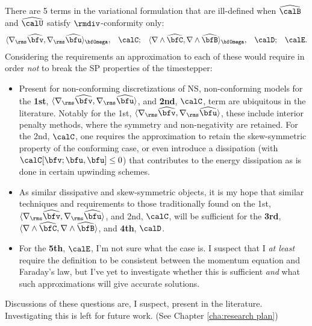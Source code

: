 \begin{remark}
        There are 5 terms in the variational formulation that are ill-defined when $\widehat{\calB}$ and $\widehat{\calU}$ satisfy $\rmdiv$-conformity only:
        \begin{align}
            \langle\nabla_{\rms}\widehat{\bfv}, \nabla_{\rms}\widehat{\bfu}\rangle_{\bfOmega},  &&
            \calC;  &&
            \langle\nabla\wedge\widehat{\bfC}, \nabla\wedge\widehat{\bfB}\rangle_{\bfOmega},  &&
            \calD;  &&
            \calE.
        \end{align}
        Considering the requirements an approximation to each of these would require in order \emph{not} to break the SP properties of the timestepper:
        \begin{itemize}
            \item  Present for non-conforming discretizations of NS, non-conforming models for the {\bf 1st}, $\langle\nabla_{\rms}\widehat{\bfv}, \nabla_{\rms}\widehat{\bfu}\rangle$, and {\bf 2nd}, $\calC$, term are ubiquitous in the literature. Notably for the 1st, $\langle\nabla_{\rms}\widehat{\bfv}, \nabla_{\rms}\widehat{\bfu}\rangle$, these include interior penalty methods, where the symmetry and non-negativity are retained. For the 2nd, $\calC$, one requires the approximation to retain the skew-symmetric property of the conforming case, or even introduce a dissipation (with $\calC[\bfv; \bfu, \bfu] \leq 0$) that contributes to the energy dissipation as is done in certain upwinding schemes.
            \item  As similar dissipative and skew-symmetric objects, it is my hope that similar techniques and requirements to those traditionally found on the 1st, $\langle\nabla_{\rms}\widehat{\bfv}, \nabla_{\rms}\widehat{\bfu}\rangle$, and 2nd, $\calC$, will be sufficient for the {\bf 3rd}, $\langle\nabla\wedge\widehat{\bfC}, \nabla\wedge\widehat{\bfB}\rangle$, and {\bf 4th}, $\calD$.
            \item  For the {\bf 5th}, $\calE$, I'm not sure what the case is. I suspect that I \emph{at least} require the definition to be consistent between the momentum equation and Faraday's law, but I've yet to investigate whether this is sufficient \emph{and} what such approximations will give accurate solutions.
        \end{itemize}
        Discussions of these questions are, I suspect, present in the literature. Investigating this is left for future work. (See Chapter \ref{cha:research plan})
    \end{remark}
    